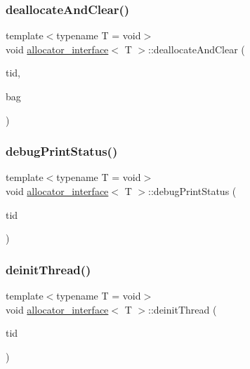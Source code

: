 \mbox{\label{classallocator__interface_ac6142b4f4c077e7dd3e2ef73fd9f8cc9}} 
\subsubsection{\texorpdfstring{deallocate\+And\+Clear()}{deallocateAndClear()}}
{\footnotesize\ttfamily template$<$typename T  = void$>$ \\
void \hyperlink{classallocator__interface}{allocator\+\_\+interface}$<$ T $>$\+::deallocate\+And\+Clear (\begin{DoxyParamCaption}\item[{const int}]{tid,  }\item[{\hyperlink{classblockbag}{blockbag}$<$ T $>$ $\ast$const}]{bag }\end{DoxyParamCaption})}

\mbox{\label{classallocator__interface_afce134aab048a2003beb1fb85e4a7562}} 
\subsubsection{\texorpdfstring{debug\+Print\+Status()}{debugPrintStatus()}}
{\footnotesize\ttfamily template$<$typename T  = void$>$ \\
void \hyperlink{classallocator__interface}{allocator\+\_\+interface}$<$ T $>$\+::debug\+Print\+Status (\begin{DoxyParamCaption}\item[{const int}]{tid }\end{DoxyParamCaption})}

\mbox{\label{classallocator__interface_a328cf20126c294a1e7ca7775a3ad401a}} 
\subsubsection{\texorpdfstring{deinit\+Thread()}{deinitThread()}}
{\footnotesize\ttfamily template$<$typename T  = void$>$ \\
void \hyperlink{classallocator__interface}{allocator\+\_\+interface}$<$ T $>$\+::deinit\+Thread (\begin{DoxyParamCaption}\item[{const int}]{tid }\end{DoxyParamCaption})}

